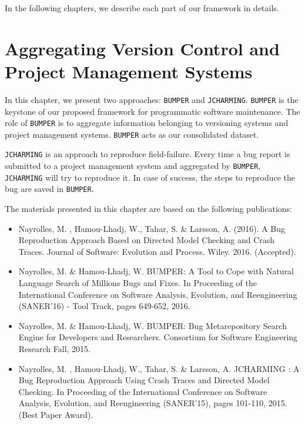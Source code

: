 In the following chapters, we describe each part of our framework in details.

\chapter{Aggregating Version Control and Project Management Systems\label{chap:aggreating}}

In this chapter, we present two approaches: {\tt BUMPER} and {\tt JCHARMING}.
{\tt BUMPER} is the keystone of our proposed framework for programmatic software maintenance.
The role of {\tt BUMPER} is to aggregate information belonging to versioning systems and project management systems.
{\tt BUMPER} acts as our consolidated dataset.

{\tt JCHARMING} is an approach to reproduce field-failure.
Every time a bug report is submitted to a project management system and aggregated by {\tt BUMPER}, {\tt JCHARMING} will try to reproduce it.
In case of success, the steps to reproduce the bug are saved in {\tt BUMPER}.

The materials presented in this chapter are based on the following publications:

\begin{itemize}
	\item Nayrolles, M. , Hamou-Lhadj, W., Tahar, S. & Larsson, A. (2016). A Bug Reproduction Approach Based on Directed Model Checking and Crash Traces. Journal of Software: Evolution and Process. Wiley. 2016. (Accepted).
	\item Nayrolles, M. \& Hamou-Lhadj, W. BUMPER: A Tool to Cope with Natural Language Search of Millions Bugs and Fixes. In Proceeding of the International Conference on Software Analysis, Evolution, and Reengineering (SANER'16) - Tool Track, pages 649-652, 2016.
	\item Nayrolles, M. \& Hamou-Lhadj, W. BUMPER: Bug Metarepository Search Engine for Developers and Researchers. Consortium for Software Engineering Research Fall, 2015.
	\item Nayrolles, M. , Hamou-Lhadj, W., Tahar, S. & Larsson, A. JCHARMING : A Bug Reproduction Approach Using Crash Traces and Directed Model Checking. In Proceeding of the International Conference on Software Analysis, Evolution, and Reengineering (SANER'15), pages 101-110, 2015. (Best Paper Award).
\end{itemize}




